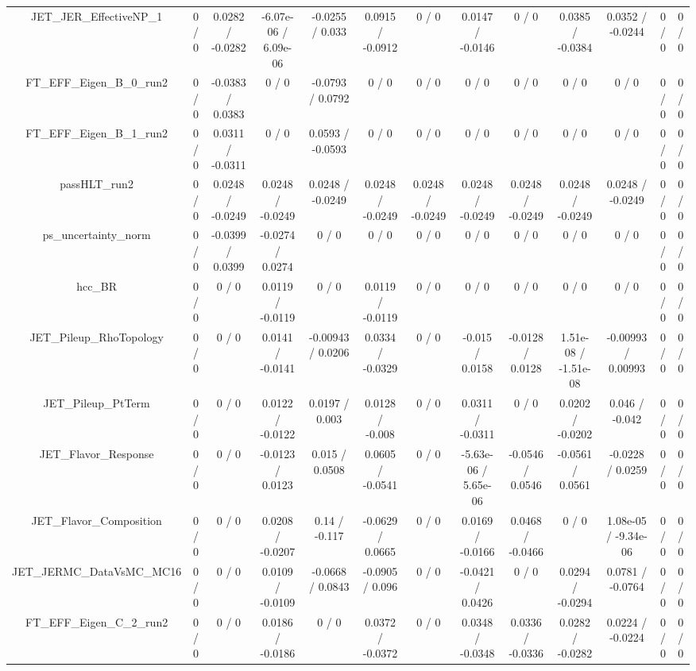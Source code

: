 \documentclass[10pt]{article}
\begin{document}
\begin{table}[htbp]
\begin{center}
\begin{tabular}{|c|c|c|c|c|c|c|c|c|c|c|c|c|}
  JET_JER_EffectiveNP_1 & 0 / 0 & 0.0282 / -0.0282 & -6.07e-06 / 6.09e-06 & -0.0255 / 0.033 & 0.0915 / -0.0912 & 0 / 0 & 0.0147 / -0.0146 & 0 / 0 & 0.0385 / -0.0384 & 0.0352 / -0.0244 & 0 / 0 & 0 / 0 \\ 
  FT_EFF_Eigen_B_0_run2 & 0 / 0 & -0.0383 / 0.0383 & 0 / 0 & -0.0793 / 0.0792 & 0 / 0 & 0 / 0 & 0 / 0 & 0 / 0 & 0 / 0 & 0 / 0 & 0 / 0 & 0 / 0 \\ 
  FT_EFF_Eigen_B_1_run2 & 0 / 0 & 0.0311 / -0.0311 & 0 / 0 & 0.0593 / -0.0593 & 0 / 0 & 0 / 0 & 0 / 0 & 0 / 0 & 0 / 0 & 0 / 0 & 0 / 0 & 0 / 0 \\ 
  passHLT_run2 & 0 / 0 & 0.0248 / -0.0249 & 0.0248 / -0.0249 & 0.0248 / -0.0249 & 0.0248 / -0.0249 & 0.0248 / -0.0249 & 0.0248 / -0.0249 & 0.0248 / -0.0249 & 0.0248 / -0.0249 & 0.0248 / -0.0249 & 0 / 0 & 0 / 0 \\ 
  ps_uncertainty_norm & 0 / 0 & -0.0399 / 0.0399 & -0.0274 / 0.0274 & 0 / 0 & 0 / 0 & 0 / 0 & 0 / 0 & 0 / 0 & 0 / 0 & 0 / 0 & 0 / 0 & 0 / 0 \\ 
  hcc_BR & 0 / 0 & 0 / 0 & 0.0119 / -0.0119 & 0 / 0 & 0.0119 / -0.0119 & 0 / 0 & 0 / 0 & 0 / 0 & 0 / 0 & 0 / 0 & 0 / 0 & 0 / 0 \\ 
  JET_Pileup_RhoTopology & 0 / 0 & 0 / 0 & 0.0141 / -0.0141 & -0.00943 / 0.0206 & 0.0334 / -0.0329 & 0 / 0 & -0.015 / 0.0158 & -0.0128 / 0.0128 & 1.51e-08 / -1.51e-08 & -0.00993 / 0.00993 & 0 / 0 & 0 / 0 \\ 
  JET_Pileup_PtTerm & 0 / 0 & 0 / 0 & 0.0122 / -0.0122 & 0.0197 / 0.003 & 0.0128 / -0.008 & 0 / 0 & 0.0311 / -0.0311 & 0 / 0 & 0.0202 / -0.0202 & 0.046 / -0.042 & 0 / 0 & 0 / 0 \\ 
  JET_Flavor_Response & 0 / 0 & 0 / 0 & -0.0123 / 0.0123 & 0.015 / 0.0508 & 0.0605 / -0.0541 & 0 / 0 & -5.63e-06 / 5.65e-06 & -0.0546 / 0.0546 & -0.0561 / 0.0561 & -0.0228 / 0.0259 & 0 / 0 & 0 / 0 \\ 
  JET_Flavor_Composition & 0 / 0 & 0 / 0 & 0.0208 / -0.0207 & 0.14 / -0.117 & -0.0629 / 0.0665 & 0 / 0 & 0.0169 / -0.0166 & 0.0468 / -0.0466 & 0 / 0 & 1.08e-05 / -9.34e-06 & 0 / 0 & 0 / 0 \\ 
  JET_JERMC_DataVsMC_MC16 & 0 / 0 & 0 / 0 & 0.0109 / -0.0109 & -0.0668 / 0.0843 & -0.0905 / 0.096 & 0 / 0 & -0.0421 / 0.0426 & 0 / 0 & 0.0294 / -0.0294 & 0.0781 / -0.0764 & 0 / 0 & 0 / 0 \\ 
  FT_EFF_Eigen_C_2_run2 & 0 / 0 & 0 / 0 & 0.0186 / -0.0186 & 0 / 0 & 0.0372 / -0.0372 & 0 / 0 & 0.0348 / -0.0348 & 0.0336 / -0.0336 & 0.0282 / -0.0282 & 0.0224 / -0.0224 & 0 / 0 & 0 / 0 \\ 

\end{tabular}
\end{center}
\end{table}
\end{document}
